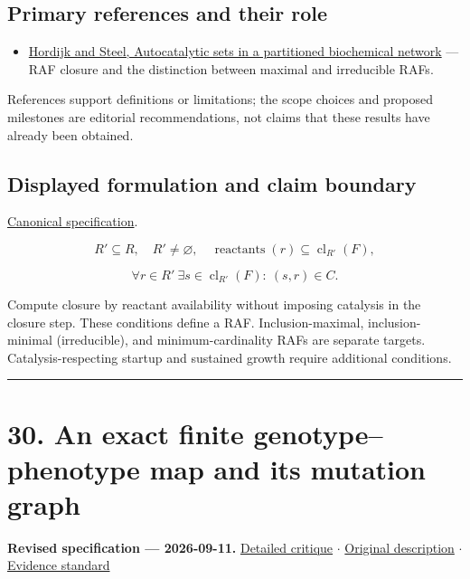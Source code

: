 \documentclass[
  11pt,
]{article}
\providecommand{\tightlist}{%
  \setlength{\itemsep}{0pt}\setlength{\parskip}{0pt}}
\begin{document}
\subsection{Primary references and their role}

\begin{itemize}
\tightlist
\item
  \href{https://pmc.ncbi.nlm.nih.gov/articles/PMC4034171/}{Hordijk and
  Steel, Autocatalytic sets in a partitioned biochemical network} ---
  RAF closure and the distinction between maximal and irreducible RAFs.
\end{itemize}

References support definitions or limitations; the scope choices and
proposed milestones are editorial recommendations, not claims that these
results have already been obtained.

\subsection{Displayed formulation and claim boundary}

\href{https://github.com/rick-stevens-ai/Pure-Thought/blob/main/PRDs/29-Chemical-Reaction-Networks-Origins.md}{Canonical
specification}.

\[R'\subseteq R,\quad R'\ne\varnothing,\quad
\operatorname{reactants}(r)\subseteq\operatorname{cl}_{R'}(F),\]

\[\forall r\in R'\ \exists s\in\operatorname{cl}_{R'}(F):\ (s,r)\in C.\]

Compute closure by reactant availability without imposing catalysis in
the closure step. These conditions define a RAF. Inclusion-maximal,
inclusion-minimal (irreducible), and minimum-cardinality RAFs are
separate targets. Catalysis-respecting startup and sustained growth
require additional conditions.

\begin{center}\rule{0.5\linewidth}{0.5pt}\end{center}

\section{30. An exact finite genotype--phenotype map and its mutation
graph}

\textbf{Revised specification --- 2026-09-11.}
\href{https://github.com/rick-stevens-ai/Pure-Thought/blob/main/reviews/30-Genotype-Phenotype-Mapping.md}{Detailed
critique} \ensuremath{\cdot}
\href{https://github.com/rick-stevens-ai/Pure-Thought/blob/main/archive/original-PRDs/30-Genotype-Phenotype-Mapping.md}{Original
description} \ensuremath{\cdot}
\href{https://github.com/rick-stevens-ai/Pure-Thought/blob/main/reviews/EVIDENCE-STANDARD.md}{Evidence
standard}
\end{document}
